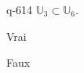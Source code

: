 \begin{truefalse}{q-614}
$\mathbb U_3 \subset  \mathbb U_6$.
\item* Vrai
\item Faux
\end{truefalse}

